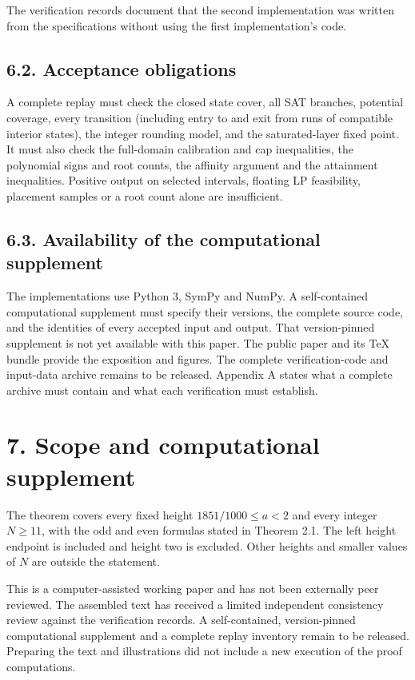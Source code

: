 \documentclass[
  11pt,
  a4paper,
]{article}
\begin{document}
The verification records document that the second implementation was
written from the specifications without using the first implementation's
code.

\subsection{6.2. Acceptance obligations}\label{acceptance-obligations}

A complete replay must check the closed state cover, all SAT branches,
potential coverage, every transition (including entry to and exit from
runs of compatible interior states), the integer rounding model, and the
saturated-layer fixed point. It must also check the full-domain
calibration and cap inequalities, the polynomial signs and root counts,
the affinity argument and the attainment inequalities. Positive output
on selected intervals, floating LP feasibility, placement samples or a
root count alone are insufficient.

\subsection{6.3. Availability of the computational
supplement}\label{availability-of-the-computational-supplement}

The implementations use Python 3, SymPy and NumPy. A self-contained
computational supplement must specify their versions, the complete
source code, and the identities of every accepted input and output. That
version-pinned supplement is not yet available with this paper. The
public paper and its TeX bundle provide the exposition and figures. The
complete verification-code and input-data archive remains to be
released. Appendix A states what a complete archive must contain and
what each verification must establish.

\section{7. Scope and computational
supplement}\label{scope-and-computational-supplement}

The theorem covers every fixed height \(1851/1000\le a<2\) and every
integer \(N\ge11\), with the odd and even formulas stated in Theorem
2.1. The left height endpoint is included and height two is excluded.
Other heights and smaller values of \(N\) are outside the statement.

This is a computer-assisted working paper and has not been externally
peer reviewed. The assembled text has received a limited independent
consistency review against the verification records. A self-contained,
version-pinned computational supplement and a complete replay inventory
remain to be released. Preparing the text and illustrations did not
include a new execution of the proof computations.
\end{document}
